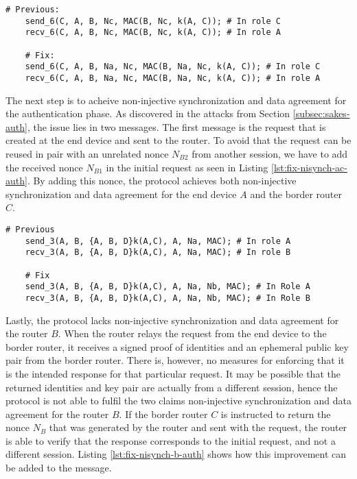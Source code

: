 \begin{lstlisting}[caption={Fix to the SAKES protocol to provide weak agreement for the end device in the authentication phase.}, label={lst:fix-weakagree-auth}]
	# Previous:
	send_6(C, A, B, Nc, MAC(B, Nc, k(A, C)); # In role C
	recv_6(C, A, B, Nc, MAC(B, Nc, k(A, C)); # In role A
	
	# Fix:
	send_6(C, A, B, Na, Nc, MAC(B, Na, Nc, k(A, C)); # In role C
	recv_6(C, A, B, Na, Nc, MAC(B, Na, Nc, k(A, C)); # In role A
\end{lstlisting}

The next step is to acheive non-injective synchronization and data agreement for the authentication phase. As discovered in the attacks from Section \ref{subsec:sakes-auth}, the issue lies in two messages. The first message is the request that is created at the end device and sent to the router. To avoid that the request can be reused in pair with an unrelated nonce $N_{B2}$ from another session, we have to add the received nonce $N_{B1}$ in the initial request as seen in Listing \ref{lst:fix-nisynch-ac-auth}. By adding this nonce, the protocol achieves both non-injective synchronization and data agreement for the end device $A$ and the border router $C$.\\

\begin{lstlisting}[caption={Fix to the SAKES protocol to provide non-injective synchronization and data agreement for the end device and the border router during the authentication phase.}, label={lst:fix-nisynch-ac-auth}]
	# Previous
	send_3(A, B, {A, B, D}k(A,C), A, Na, MAC); # In role A
	recv_3(A, B, {A, B, D}k(A,C), A, Na, MAC); # In role B

	# Fix
	send_3(A, B, {A, B, D}k(A,C), A, Na, Nb, MAC); # In Role A
	recv_3(A, B, {A, B, D}k(A,C), A, Na, Nb, MAC); # In Role B
\end{lstlisting}


Lastly, the protocol lacks non-injective synchronization and data agreement for the router $B$. When the router relays the request from the end device to the border router, it receives a signed proof of identities and an ephemeral public key pair from the border router. There is, however, no measures for enforcing that it is the intended response for that particular request. It may be possible that the returned identities and key pair are actually from a different session, hence the protocol is not able to fulfil the two claims non-injective synchronization and data agreement for the router $B$. If the border router $C$ is instructed to return the nonce $N_B$ that was generated by the router and sent with the request, the router is able to verify that the response corresponds to the initial request, and not a different session. Listing \ref{lst:fix-nisynch-b-auth} shows how this improvement can be added to the message.\\

